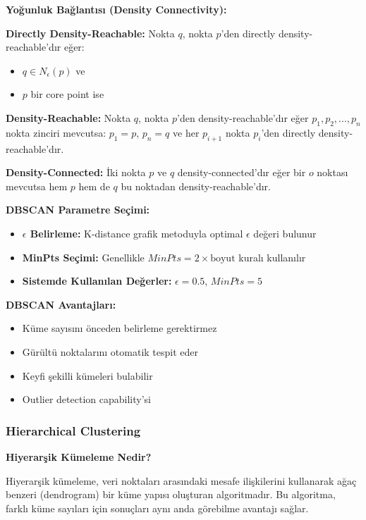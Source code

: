 \textbf{Yoğunluk Bağlantısı (Density Connectivity):}

\textbf{Directly Density-Reachable:}
Nokta $q$, nokta $p$'den directly density-reachable'dır eğer:
\begin{itemize}
    \item $q \in N_{\epsilon}(p)$ ve
    \item $p$ bir core point ise
\end{itemize}

\textbf{Density-Reachable:}
Nokta $q$, nokta $p$'den density-reachable'dır eğer $p_1, p_2, ..., p_n$ nokta zinciri mevcutsa:
$p_1 = p$, $p_n = q$ ve her $p_{i+1}$ nokta $p_i$'den directly density-reachable'dır.

\textbf{Density-Connected:}
İki nokta $p$ ve $q$ density-connected'dır eğer bir $o$ noktası mevcutsa hem $p$ hem de $q$ bu noktadan density-reachable'dır.

\newpage

\textbf{DBSCAN Parametre Seçimi:}

\begin{itemize}
    \item \textbf{$\epsilon$ Belirleme:} K-distance grafik metoduyla optimal $\epsilon$ değeri bulunur
    \item \textbf{MinPts Seçimi:} Genellikle $MinPts = 2 \times \text{boyut}$ kuralı kullanılır
    \item \textbf{Sistemde Kullanılan Değerler:} $\epsilon = 0.5$, $MinPts = 5$
\end{itemize}

\textbf{DBSCAN Avantajları:}
\begin{itemize}
    \item Küme sayısını önceden belirleme gerektirmez
    \item Gürültü noktalarını otomatik tespit eder
    \item Keyfi şekilli kümeleri bulabilir
    \item Outlier detection capability'si
\end{itemize}

\subsubsection{Hierarchical Clustering}

\textbf{Hiyerarşik Kümeleme Nedir?}

Hiyerarşik kümeleme, veri noktaları arasındaki mesafe ilişkilerini kullanarak ağaç benzeri (dendrogram) bir küme yapısı oluşturan algoritmadır. Bu algoritma, farklı küme sayıları için sonuçları aynı anda görebilme avantajı sağlar.

